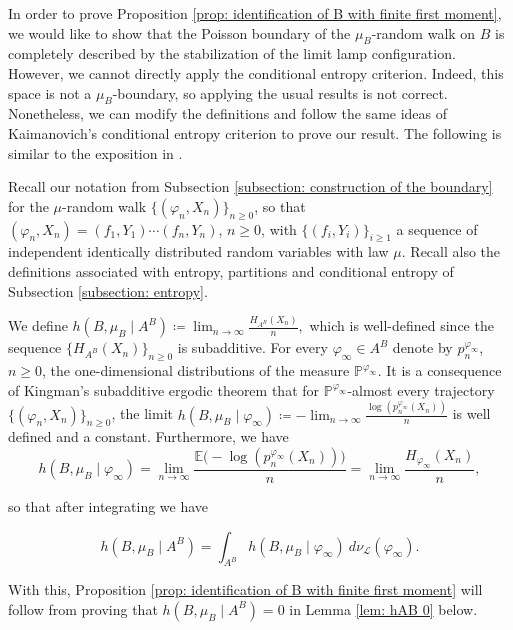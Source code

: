 \documentclass[reqno,oneside,11pt]{amsart}
\renewcommand{\P}{\mathbb{P}}
\newcommand{\E}{\mathbb{E}}
\theoremstyle{plain}
\theoremstyle{definition}
\begin{document}
In order to prove Proposition \ref{prop: identification of B with finite first moment}, we would like to show that the Poisson boundary of the $\mu_B$-random walk on $B$ is completely described by the stabilization of the limit lamp configuration. However, we cannot directly apply the conditional entropy criterion. Indeed, this space is not a $\mu_B$-boundary, so applying the usual results is not correct. Nonetheless, we can modify the definitions and follow the same ideas of Kaimanovich's conditional entropy criterion to prove our result. The following is similar to the exposition in \cite[Section 4]{Kaimanovich2000}. 

Recall our notation from Subsection \ref{subsection: construction of the boundary} for the $\mu$-random walk $\{(\varphi_n,X_n)\}_{n\ge 0}$, so that $(\varphi_n,X_n)=(f_1,Y_1)\cdots (f_n,Y_n)$, $n\ge 0$, with $\{(f_i,Y_i)\}_{i\ge 1}$ a sequence of independent identically distributed random variables with law $\mu$. Recall also the definitions associated with entropy, partitions and conditional entropy of Subsection \ref{subsection: entropy}. 

We define
$ h\left(B,\mu_B\mid A^B\right)\coloneqq \lim_{n\to \infty}\frac{H_{A^B}(X_n)}{n}, $
which is well-defined since the sequence $\{H_{A^B}(X_n)\}_{n\ge 0}$ is subadditive. For every $\varphi_{\infty}\in A^B$ denote by $p_n^{\varphi_{\infty}}$, $n\ge 0$, the one-dimensional distributions of the measure $\P^{\varphi_{\infty}}.$ It is a consequence of Kingman's subadditive ergodic theorem that for $\P^{\varphi_{\infty}}$-almost every trajectory $\{(\varphi_n,X_n)\}_{n\ge 0}$, the limit
\( h\left(B,\mu_B\mid \varphi_{\infty}\right)\coloneqq -\lim_{n\to \infty}\frac{\log(p_n^{\varphi_{\infty}}(X_n))}{n} \)
is well defined and a constant. Furthermore, we have
\[  h\left(B,\mu_B\mid \varphi_{\infty}\right)=\lim_{n\to \infty}\frac{\E\Big(-\log(p_n^{\varphi_{\infty}}(X_n))\Big)}{n}=\lim_{n\to \infty}\frac{H_{\varphi_{\infty}}(X_n)}{n}, \]

so that after integrating we have 

\begin{equation}\label{eq: relation between entropy AB and entropy varphiinfty}  h\left(B,\mu_B\mid A^B\right)=\int_{A^B} h\left(B,\mu_B\mid \varphi_{\infty}\right)\ d\nu_{\mathcal{L}}(\varphi_{\infty}).
\end{equation}

With this, Proposition \ref{prop: identification of B with finite first moment} will follow from proving that $h\left(B,\mu_B\mid A^B\right)=0$ in Lemma \ref{lem: hAB 0} below.
\end{document}
